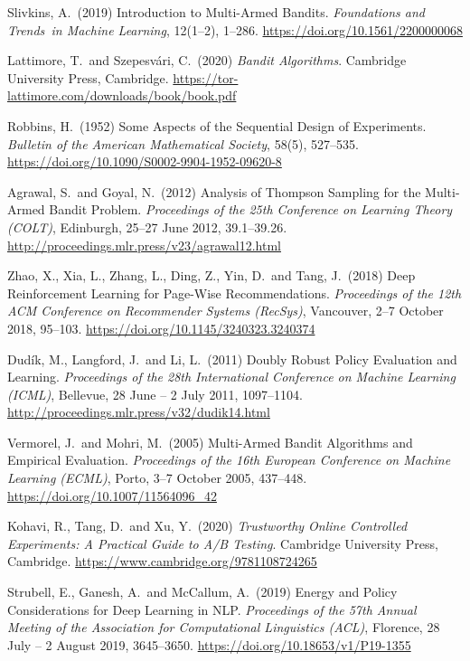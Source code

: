 \begin{enumerate}[label={[\arabic*]},
                  leftmargin=2.8em,
                  labelwidth=2.4em,
                  labelsep=0.4em,
                  itemsep=6pt,
                  align=left]
\item Slivkins, A.\ (2019) Introduction to Multi-Armed Bandits. \textit{Foundations and Trends\textregistered\ in Machine Learning}, 12(1--2), 1--286. \url{https://doi.org/10.1561/2200000068}

\item Lattimore, T.\ and Szepesv\'ari, C.\ (2020) \textit{Bandit Algorithms}. Cambridge University Press, Cambridge. \url{https://tor-lattimore.com/downloads/book/book.pdf}

\item Robbins, H.\ (1952) Some Aspects of the Sequential Design of Experiments. \textit{Bulletin of the American Mathematical Society}, 58(5), 527--535. \url{https://doi.org/10.1090/S0002-9904-1952-09620-8}

\item Agrawal, S.\ and Goyal, N.\ (2012) Analysis of Thompson Sampling for the Multi-Armed Bandit Problem. \textit{Proceedings of the 25th Conference on Learning Theory (COLT)}, Edinburgh, 25--27 June 2012, 39.1--39.26. \url{http://proceedings.mlr.press/v23/agrawal12.html}

\item Zhao, X., Xia, L., Zhang, L., Ding, Z., Yin, D.\ and Tang, J.\ (2018) Deep Reinforcement Learning for Page-Wise Recommendations. \textit{Proceedings of the 12th ACM Conference on Recommender Systems (RecSys)}, Vancouver, 2--7 October 2018, 95--103. \url{https://doi.org/10.1145/3240323.3240374}

\item Dud\'ik, M., Langford, J.\ and Li, L.\ (2011) Doubly Robust Policy Evaluation and Learning. \textit{Proceedings of the 28th International Conference on Machine Learning (ICML)}, Bellevue, 28 June -- 2 July 2011, 1097--1104. \url{http://proceedings.mlr.press/v32/dudik14.html}

\item Vermorel, J.\ and Mohri, M.\ (2005) Multi-Armed Bandit Algorithms and Empirical Evaluation. \textit{Proceedings of the 16th European Conference on Machine Learning (ECML)}, Porto, 3--7 October 2005, 437--448. \url{https://doi.org/10.1007/11564096_42}

\item Kohavi, R., Tang, D.\ and Xu, Y.\ (2020) \textit{Trustworthy Online Controlled Experiments: A Practical Guide to A/B Testing}. Cambridge University Press, Cambridge. \url{https://www.cambridge.org/9781108724265}

\item Strubell, E., Ganesh, A.\ and McCallum, A.\ (2019) Energy and Policy Considerations for Deep Learning in NLP. \textit{Proceedings of the 57th Annual Meeting of the Association for Computational Linguistics (ACL)}, Florence, 28 July -- 2 August 2019, 3645--3650. \url{https://doi.org/10.18653/v1/P19-1355}


\end{enumerate}
